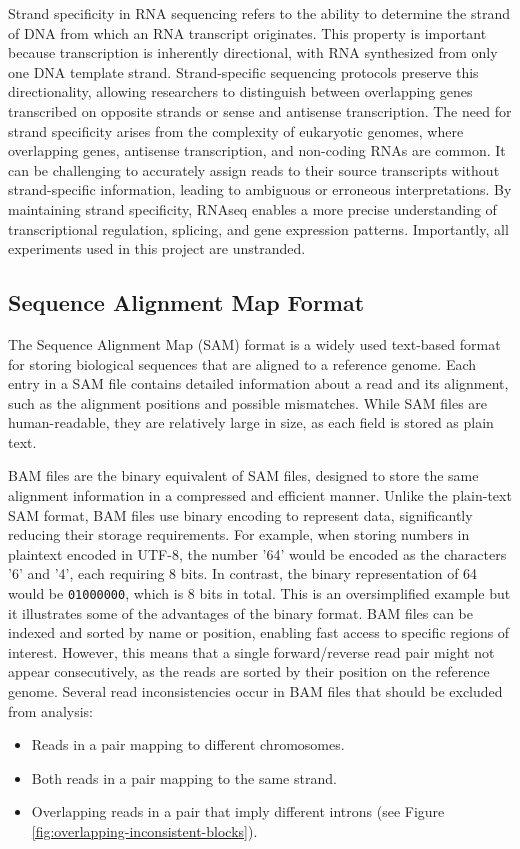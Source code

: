 \documentclass{article}
\begin{document}
    Strand specificity in RNA sequencing refers to the ability to determine the strand of DNA from which an RNA transcript originates. This property is important because transcription is inherently directional, with RNA synthesized from only one DNA template strand. Strand-specific sequencing protocols preserve this directionality, allowing researchers to distinguish between overlapping genes transcribed on opposite strands or sense and antisense transcription. The need for strand specificity arises from the complexity of eukaryotic genomes, where overlapping genes, antisense transcription, and non-coding RNAs are common. It can be challenging to accurately assign reads to their source transcripts without strand-specific information, leading to ambiguous or erroneous interpretations. By maintaining strand specificity, RNAseq enables a more precise understanding of transcriptional regulation, splicing, and gene expression patterns. Importantly, all experiments used in this project are unstranded.


    \subsection[SAM Format]{Sequence Alignment Map Format}\label{subsec:sequence-alignment-map-format}
    The Sequence Alignment Map (SAM) format is a widely used text-based format for storing biological sequences that are aligned to a reference genome. Each entry in a SAM file contains detailed information about a read and its alignment, such as the alignment positions and possible mismatches. While SAM files are human-readable, they are relatively large in size, as each field is stored as plain text.

    BAM files are the binary equivalent of SAM files, designed to store the same alignment information in a compressed and efficient manner. Unlike the plain-text SAM format, BAM files use binary encoding to represent data, significantly reducing their storage requirements. For example, when storing numbers in plaintext encoded in UTF-8, the number '64' would be encoded as the characters '6' and '4', each requiring 8 bits. In contrast, the binary representation of 64 would be \texttt{01000000}, which is 8 bits in total. This is an oversimplified example but it illustrates some of the advantages of the binary format. BAM files can be indexed and sorted by name or position, enabling fast access to specific regions of interest. However, this means that a single forward/reverse read pair might not appear consecutively, as the reads are sorted by their position on the reference genome. Several read inconsistencies occur in BAM files that should be excluded from analysis:
    \begin{itemize}
        \item Reads in a pair mapping to different chromosomes.
        \item Both reads in a pair mapping to the same strand.
        \item Overlapping reads in a pair that imply different introns (see Figure \ref{fig:overlapping-inconsistent-blocks}).
    \end{itemize}
\end{document}
